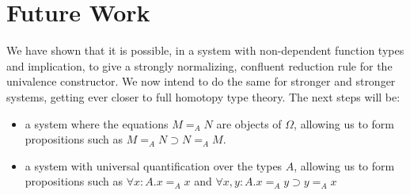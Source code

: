 



\section{Future Work}

We have shown that it is possible, in a system with non-dependent function types and implication, to give a strongly normalizing,
confluent reduction rule for the univalence constructor.  We now intend to do the same for stronger and stronger systems, getting
ever closer to full homotopy type theory.  The next steps will be:

\begin{itemize}
\item
a system where the equations $M =_A N$ are objects of $\Omega$, allowing us to form propositions such as $M =_A N \supset N =_A M$.
\item
a system with universal quantification over the types $A$, allowing us to form propositions such as $\forall x:A. x =_A x$ and
$\forall x,y : A. x =_A y \supset y =_A x$
\end{itemize}

